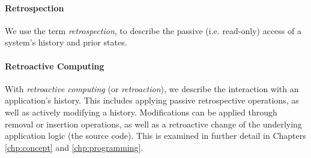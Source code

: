 \paragraph{Retrospection}
We use the term \emph{retrospection}, to describe the passive (i.e. read-only) 
access of a system's history and prior states.

\paragraph{Retroactive Computing}
With \emph{retroactive computing} (or \emph{retroaction}), we describe the 
interaction with an application's history.  %
This includes applying passive retrospective operations, as well as actively
modifying a history. Modifications can be applied through removal or insertion 
operations, as well as a retroactive change of the underlying application 
logic (the source code). This is examined in further detail in Chapters 
\ref{chp:concept} and \ref{chp:programming}.

